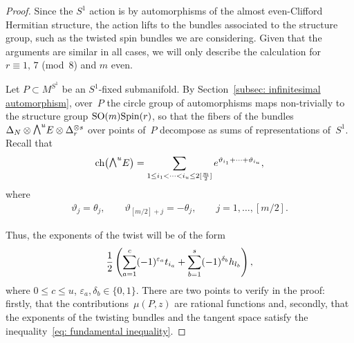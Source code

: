 \documentclass[pdftex]{sigma}
\newcommand{\ext}{\raise1pt\hbox{$\textstyle\bigwedge$}}
\newcommand{\ch}{\mbox{\rm ch}}
\numberwithin{equation}{section}
\begin{document}
\begin{proof}
Since the $S^1$ action is by automorphisms of the almost even-Clif\/ford Hermitian structure, the action lifts to the bundles associated to the structure group, such as the twisted spin bundles we are considering. Given that the arguments are similar in all cases, we will only describe the calculation for $r\equiv 1,\, 7$ (mod~8) and $m$ even.

Let $P\subset M^{S^1}$ be an $S^1$-f\/ixed submanifold. By Section~\ref{subsec: infinitesimal automorphism}, over~$P$ the circle group of automorphisms maps non-trivially to the structure group ${\rm SO}(m){\rm Spin}(r)$, so that the f\/ibers of the bundles $\Delta_N\otimes \ext^uE\otimes \Delta_r^{\otimes s}$ over points of~$P$ decompose as sums of representations of~$S^1$. Recall that
\begin{gather*}
 \ch\big(\ext^uE\big) = \sum_{1\leq i_1<\dots<i_u\leq 2[\frac{m}{2}]}e^{\vartheta_{i_1} +\dots+\vartheta_{i_u}},
\end{gather*}
where
\begin{gather*}
 \vartheta_j = \theta_j,\qquad \vartheta_{[m/2]+j} = -\theta_j,\qquad j=1,\dots,[m/2].
\end{gather*}

Thus, the exponents of the twist will be of the form
\begin{gather*}{1\over 2}\left(\sum_{a=1}^c (-1)^{\varepsilon_a}t_{i_a}+\sum_{b=1}^s (-1)^{\delta_b}h_{l_b}\right),\end{gather*}
where $0\leq c\leq u$, $\varepsilon_a,\delta_b\in \{ 0,1 \}$. There are two points to verify in the proof: f\/irstly, that the contributions~$\mu(P,z)$ are rational functions and, secondly, that the exponents of the twisting bundles and the tangent space satisfy the inequality~\eqref{eq: fundamental inequality}.


\end{proof}
\end{document}

